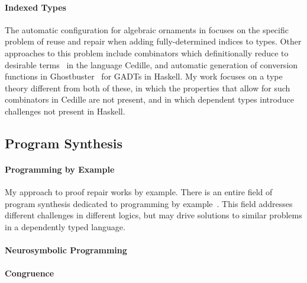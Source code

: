 \paragraph{Indexed Types}
The automatic configuration for algebraic ornaments in \toolnamec focuses on the specific problem of reuse and repair when adding fully-determined indices to types.
Other approaches to this problem include combinators which definitionally reduce to desirable terms~\cite{DBLP:journals/corr/abs-1803-08150} in the language Cedille,
and automatic generation of conversion functions in Ghostbuster~\cite{McDonell:2016:GTS:2951913.2951914} for GADTs in Haskell.
My work focuses on a type theory different from both of these, in which the properties that allow for such combinators in Cedille are not present, and in which dependent types introduce challenges not present in Haskell.

\subsection{Program Synthesis}
\label{sec:synthesis}

\paragraph{Programming by Example}
My approach to proof repair works by example.
There is an entire field of program synthesis dedicated to programming by example~\cite{DBLP:journals/ftpl/GulwaniPS17}. 
This field addresses different challenges in different logics,
but may drive solutions to similar problems in a dependently typed language.

\paragraph{Neurosymbolic Programming}

\paragraph{Congruence}

\fi


